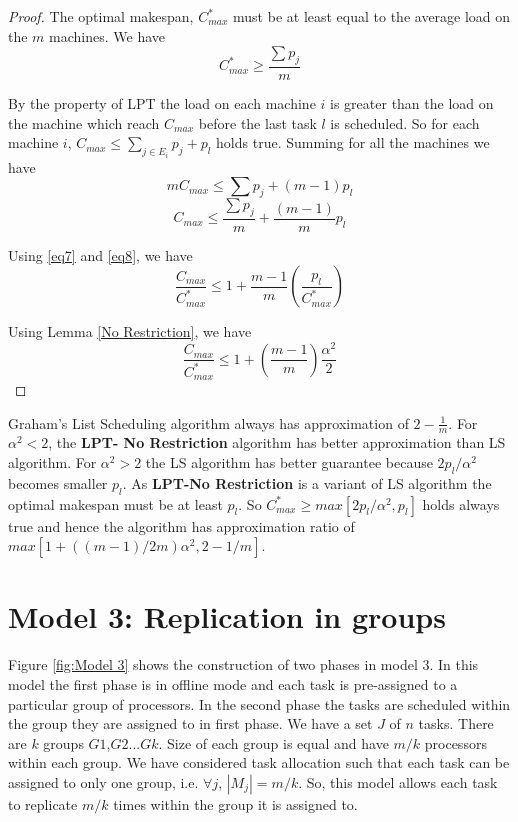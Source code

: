 \documentclass[10pt, conference, compsocconf]{IEEEtran}
\begin{document}
\begin{proof}
The optimal makespan, $C_{max}^{*}$ must be at least equal to the average load on the $m$ machines. We have
\begin{equation}\label{eq7}
C_{max}^{*}\geq\frac{\sum p_j}{m}
\end{equation}

By the property of LPT the load on each machine $i$ is greater than the load on the machine which reach $C_{max}$ before the last task $l$ is scheduled. So for each machine $i$, $C_{max} \leq  \sum_{j \in E_i}^{}{p_j} + p_l$ holds true.  Summing for all the machines we have
\begin{equation}\nonumber 
mC_{max} \leq  \sum {p_j} + (m-1)p_l
\end{equation}
\begin{equation}\label{eq8}
C_{max} \leq  \frac{\sum {p_j}}{m} + \frac{(m-1)}{m}p_l
\end{equation}

Using \ref{eq7} and \ref{eq8}, we have
\begin{equation}\nonumber
\frac{C_{max}}{C_{max}^{*}} \leq 1 + {\frac{m-1}{m}}\left(\frac{p_l}{C_{max}^{*}}\right)
\end{equation}

Using Lemma \ref{No Restriction}, we have 
\begin{equation}\nonumber
\frac{C_{max}}{C_{max}^{*}} \leq 1 + \left(\frac{m-1}{m}\right)\frac{\alpha^{2}}{2}
\end{equation}

\end{proof}  

Graham's List Scheduling algorithm always has approximation of $2-\frac{1}{m}$. For $\alpha^2 < 2$, the \textbf{LPT- No Restriction} algorithm has better approximation than LS algorithm. For $\alpha^2 > 2$ the LS algorithm has better guarantee because $2p_l/\alpha^2$ becomes smaller $p_l$. As \textbf{LPT-No Restriction} is a variant of LS algorithm the optimal makespan must be at least $p_l$. So  $C_{max}^{*}\geq max[2p_l/\alpha^2,p_l]$ holds always true and hence the algorithm has approximation ratio of $max[1 + ((m-1)/2m)\alpha^{2},2-1/m ]$.   



\section{Model 3: Replication in groups}
Figure \ref{fig:Model 3} shows the construction of two phases in model 3.  In this model the first phase is in offline mode and each task is pre-assigned to a particular  group of processors. In the second phase the tasks are scheduled  within the group they are assigned to in first phase.   We have a set $J$ of $ n$ tasks.  There are $k$ groups $G1$,$G2$...$Gk$.   Size of each group is equal and have $m/k$ processors within each group.  We have considered task allocation such that each task can be assigned to only one group, i.e. $\forall j$, $|M_j|= m/k$. So, this model allows each task to replicate $ m/k $ times within the group it is assigned to.
\end{document}
